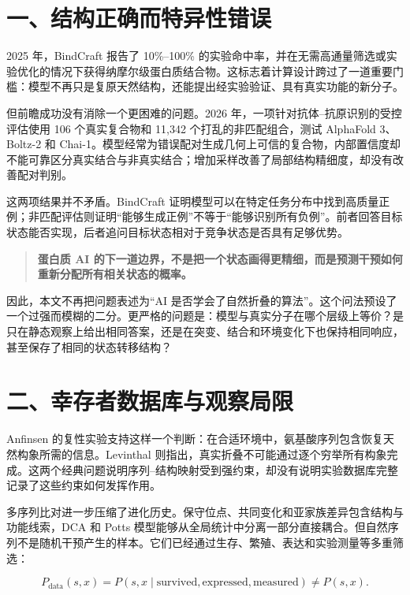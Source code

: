\documentclass[10pt]{article}
\newenvironment{keyidea}
{\begin{quote}\color{ruleblue}\CJKfamily{sf}\large\bfseries}
{\end{quote}}
\begin{document}
\section*{一、结构正确而特异性错误}

2025 年，BindCraft 报告了 10\%--100\% 的实验命中率，并在无需高通量筛选或实验优化的情况下获得纳摩尔级蛋白质结合物\cite{pacesa2025}。这标志着计算设计跨过了一道重要门槛：模型不再只是复原天然结构，还能提出经实验验证、具有真实功能的新分子。

但前瞻成功没有消除一个更困难的问题。2026 年，一项针对抗体--抗原识别的受控评估使用 106 个真实复合物和 11,342 个打乱的非匹配组合，测试 AlphaFold 3、Boltz-2 和 Chai-1。模型经常为错误配对生成几何上可信的复合物，内部置信度却不能可靠区分真实结合与非真实结合；增加采样改善了局部结构精细度，却没有改善配对判别\cite{smorodina2026}。

这两项结果并不矛盾。BindCraft 证明模型可以在特定任务分布中找到高质量正例；非匹配评估则证明“能够生成正例”不等于“能够识别所有负例”。前者回答目标状态能否实现，后者追问目标状态相对于竞争状态是否具有足够优势。

\begin{keyidea}
蛋白质 AI 的下一道边界，不是把一个状态画得更精细，而是预测干预如何重新分配所有相关状态的概率。
\end{keyidea}

因此，本文不再把问题表述为“AI 是否学会了自然折叠的算法”。这个问法预设了一个过强而模糊的二分。更严格的问题是：模型与真实分子在哪个层级上等价？是只在静态观察上给出相同答案，还是在突变、结合和环境变化下也保持相同响应，甚至保存了相同的状态转移结构？

\section*{二、幸存者数据库与观察局限}

Anfinsen 的复性实验支持这样一个判断：在合适环境中，氨基酸序列包含恢复天然构象所需的信息\cite{anfinsen1973}。Levinthal 则指出，真实折叠不可能通过逐个穷举所有构象完成\cite{levinthal1969}。这两个经典问题说明序列--结构映射受到强约束，却没有说明实验数据库完整记录了这些约束如何发挥作用。

多序列比对进一步压缩了进化历史。保守位点、共同变化和亚家族差异包含结构与功能线索，DCA 和 Potts 模型能够从全局统计中分离一部分直接耦合\cite{morcos2011,ekeberg2013}。但自然序列不是随机干预产生的样本。它们已经通过生存、繁殖、表达和实验测量等多重筛选：

\begin{equation}
P_{\mathrm{data}}(s,x)
=
P\!\left(s,x\mid
\mathrm{survived},\mathrm{expressed},\mathrm{measured}\right)
\neq P(s,x).
\label{eq:survivor}
\end{equation}
\end{document}
